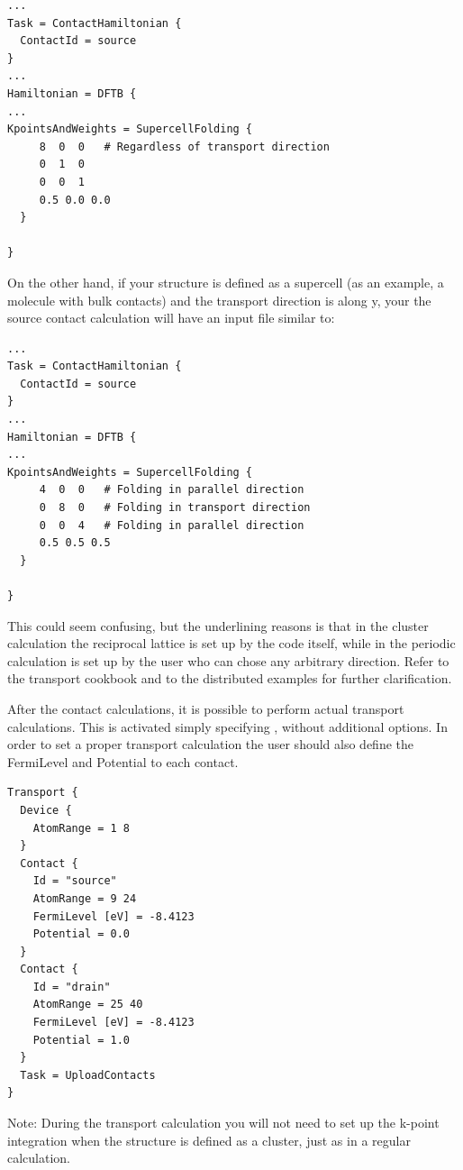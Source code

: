 \begin{verbatim}
...
Task = ContactHamiltonian {
  ContactId = source
}
...
Hamiltonian = DFTB {
...
KpointsAndWeights = SupercellFolding {
     8  0  0   # Regardless of transport direction
     0  1  0
     0  0  1
     0.5 0.0 0.0
  }

}
\end{verbatim}

On the other hand, if your structure is defined as a supercell (as an example, a
molecule with bulk contacts) and the transport direction is along y, your the
source contact calculation will have an input file similar to:

\begin{verbatim}
...
Task = ContactHamiltonian {
  ContactId = source
}
...
Hamiltonian = DFTB {
...
KpointsAndWeights = SupercellFolding {
     4  0  0   # Folding in parallel direction
     0  8  0   # Folding in transport direction
     0  0  4   # Folding in parallel direction
     0.5 0.5 0.5
  }

}
\end{verbatim}


This could seem confusing, but the underlining reasons is that in the cluster
calculation the reciprocal lattice is set up by the code itself, while in the
periodic calculation is set up by the user who can chose any arbitrary
direction.  Refer to the transport cookbook and to the distributed examples for
further clarification.

 After the contact calculations, it is
possible to perform actual transport calculations. This is activated simply
specifying , without additional options. In order to
set a proper transport calculation the user should also define the FermiLevel
and Potential to each contact.
\begin{verbatim}
Transport {
  Device {
    AtomRange = 1 8
  }
  Contact {
    Id = "source"
    AtomRange = 9 24
    FermiLevel [eV] = -8.4123
    Potential = 0.0 
  }
  Contact {
    Id = "drain"
    AtomRange = 25 40
    FermiLevel [eV] = -8.4123
    Potential = 1.0 
  }
  Task = UploadContacts
}
\end{verbatim}

Note: During the transport calculation you will not need to set up the k-point
integration when the structure is defined as a cluster, just as in a regular
\dftbp{} calculation.

 

